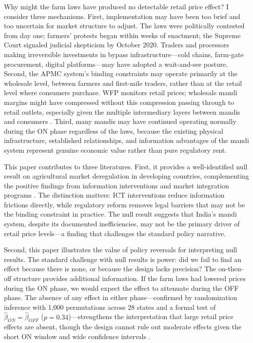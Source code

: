\documentclass[12pt]{article}
\begin{document}
Why might the farm laws have produced no detectable retail price effect? I consider three mechanisms. First, implementation may have been too brief and too uncertain for market structure to adjust. The laws were politically contested from day one; farmers' protests began within weeks of enactment; the Supreme Court signaled judicial skepticism by October 2020. Traders and processors making irreversible investments in bypass infrastructure---cold chains, farm-gate procurement, digital platforms---may have adopted a wait-and-see posture. Second, the APMC system's binding constraints may operate primarily at the wholesale level, between farmers and first-mile traders, rather than at the retail level where consumers purchase. WFP monitors retail prices; wholesale mandi margins might have compressed without this compression passing through to retail outlets, especially given the multiple intermediary layers between mandis and consumers \citep{chand2012development}. Third, many mandis may have continued operating normally during the ON phase regardless of the laws, because the existing physical infrastructure, established relationships, and information advantages of the mandi system represent genuine economic value rather than pure regulatory rent.

This paper contributes to three literatures. First, it provides a well-identified null result on agricultural market deregulation in developing countries, complementing the positive findings from information interventions \citep{jensen2007digital, aker2010information, goyal2010information} and market integration programs \citep{fackler2001spatial, atkin2018retail}. The distinction matters: ICT interventions reduce information frictions directly, while regulatory reform removes legal barriers that may not be the binding constraint in practice. The null result suggests that India's mandi system, despite its documented inefficiencies, may not be the primary driver of retail price levels---a finding that challenges the standard policy narrative.

Second, this paper illustrates the value of policy reversals for interpreting null results. The standard challenge with null results is power: did we fail to find an effect because there is none, or because the design lacks precision? The on-then-off structure provides additional information. If the farm laws had lowered prices during the ON phase, we would expect the effect to attenuate during the OFF phase. The absence of any effect in either phase---confirmed by randomization inference with 1,000 permutations across 28 states and a formal test of $\hat\beta_{ON} = \hat\beta_{OFF}$ ($p = 0.34$)---strengthens the interpretation that large retail price effects are absent, though the design cannot rule out moderate effects given the short ON window and wide confidence intervals \citep{callaway2021difference, roth2023pretest, dechaisemartin2020two}.
\end{document}
